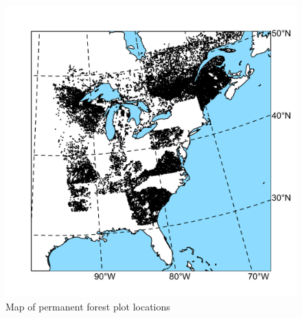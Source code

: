 \documentclass[11pt]{article}
\begin{document}
\begin{figure}[t]
\includegraphics[width=4.5in]{figs/plotmap.png}
\caption{Map of permanent forest plot locations}
\label{fig:plotmap}
\end{figure}
\end{document}
